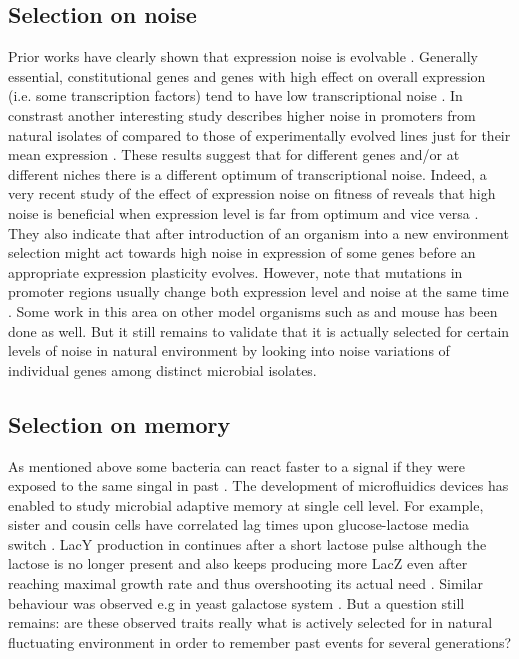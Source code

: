\subsection{Selection on noise}
Prior works have clearly shown that expression noise is evolvable \cite{richard2014does}.
Generally essential, constitutional genes and genes with high effect on overall expression (i.e. some transcription factors) tend to have low transcriptional noise \cite{silander2012genome, metzger2015selection}.
In constrast another interesting study describes higher noise in promoters from natural isolates of  compared to those of experimentally evolved lines just for their mean expression \cite{wolf2015expression}.
These results suggest that for different genes and/or at different niches there is a different optimum of transcriptional noise.
Indeed, a very recent study of the effect of expression noise on fitness of  reveals that high noise is beneficial when expression level is far from optimum and vice versa \cite{duveau2018fitness}.
They also indicate that after introduction of an organism into a new environment selection might act towards high noise in expression of some genes before an appropriate expression plasticity evolves.
However, note that mutations in promoter regions usually change both expression level and noise at the same time \cite{metzger2015selection}.
Some work in this area on other model organisms such as  \cite{schor2017promoter} and mouse \cite{barroso2017evolution} has been done as well.
But it still remains to validate that it is actually selected for certain levels of noise in natural environment by looking into noise variations of individual genes among distinct microbial isolates.

\subsection{Selection on memory}
As mentioned above some bacteria can react faster to a signal if they were exposed to the same singal in past \cite{novick1957enzyme}.
The development of microfluidics devices has enabled to study microbial adaptive memory at single cell level.
For example, sister and cousin cells have correlated lag times upon glucose-lactose media switch \cite{boulineau2013single, kaiser2018monitoring}.
LacY production in  continues after a short lactose pulse although the lactose is no longer present \cite{lambert2014memory} and  also keeps producing more LacZ even after reaching maximal growth rate and thus overshooting its actual need \cite{kaiser2018monitoring}.
Similar behaviour was observed e.g in yeast galactose system \cite{zacharioudakis2007yeast, razinkov2013measuring}.
But a question still remains: are these observed traits really what is actively selected for in natural fluctuating environment in order to remember past events for several generations?

